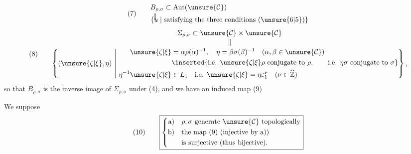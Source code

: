  
\[
(7)\qquad
\begin{aligned}
B_{\rho,\sigma}&\subset\mathrm{Aut}(\unsure{\mathcal{C}})\\[-2pt]
\Vert\quad&\\[-10pt]
\{u\mid{}&\text{satisfying the three conditions }(\unsure{6|5})\}
\end{aligned}
\]
\[
(8)\qquad
\begin{gathered}
\Sigma_{\rho,\sigma}\subset\unsure{\mathcal{C}}\times\unsure{\mathcal{C}}\\[-2pt]
\Vert\\[-2pt]
\left\{(\unsure{\zeta|\xi},\eta)\ \middle|\ 
\begin{aligned}
\unsure{\zeta|\xi}&=\alpha\rho(\alpha)^{-1},\quad
\eta=\beta\sigma(\beta)^{-1}\quad(\alpha,\beta\in\unsure{\mathcal{C}})\\
&\inserted{\text{i.e. }\unsure{\zeta|\xi}\rho\text{ conjugate to }\rho,\qquad\text{i.e. }\eta\sigma\text{ conjugate to }\sigma}\\
\eta^{-1}\unsure{\zeta|\xi}&\in L_1\quad\text{i.e. }\unsure{\zeta|\xi}=\eta\varepsilon_1^\nu\quad(\nu\in\widehat{\mathbb Z})
\end{aligned}\right\},
\end{gathered}
\]
so that $B_{\rho,\sigma}$ is the inverse image of $\Sigma_{\rho,\sigma}$ under (4), and we have an induced map
\diagram{\begin{tikzcd}
B_{\rho,\sigma}\arrow[r,"\varphi=\varphi_{\rho,\sigma}"]&\Sigma_{\rho,\sigma}.
\end{tikzcd}}\hfill(9)

We suppose
\[
(10)\qquad\boxed{\left\{\begin{aligned}
\text{a)}\quad&\rho,\sigma\text{ generate }\unsure{\mathcal{C}}\text{ topologically}\\
\text{b)}\quad&\text{the map (9) (injective by a))}\\
&\text{is surjective (thus bijective).}
\end{aligned}\right.}
\]

